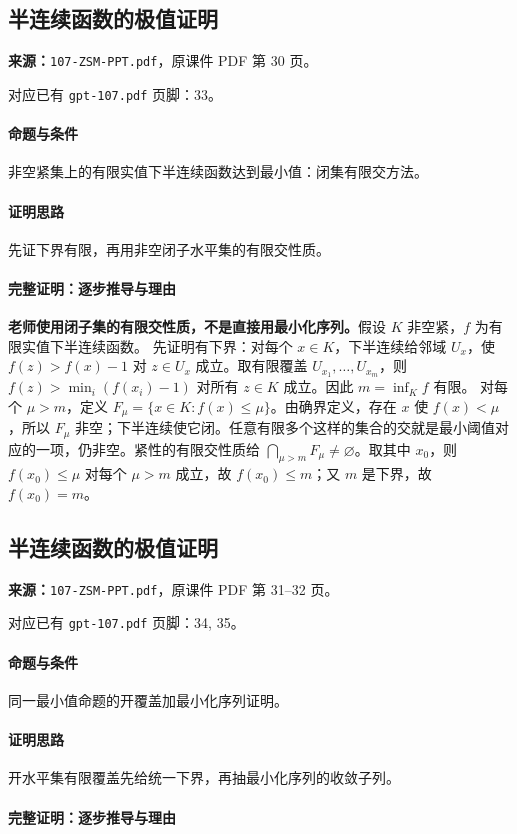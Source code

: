 \clearpage\subsection{半连续函数的极值证明}
\textbf{来源：}\texttt{107-ZSM-PPT.pdf}，原课件 PDF 第 30 页。\par
对应已有 \texttt{gpt-107.pdf} 页脚：33。\par
\paragraph{命题与条件}非空紧集上的有限实值下半连续函数达到最小值：闭集有限交方法。
\paragraph{证明思路}先证下界有限，再用非空闭子水平集的有限交性质。
\paragraph{完整证明：逐步推导与理由}
\textbf{老师使用闭子集的有限交性质，不是直接用最小化序列。}假设 $K$ 非空紧，$f$ 为有限实值下半连续函数。
先证明有下界：对每个 $x\in K$，下半连续给邻域 $U_x$，使 $f(z)>f(x)-1$ 对 $z\in U_x$ 成立。取有限覆盖 $U_{x_1},\ldots,U_{x_m}$，则 $f(z)>\min_i(f(x_i)-1)$ 对所有 $z\in K$ 成立。因此 $m=\inf_K f$ 有限。
对每个 $\mu>m$，定义 $F_\mu=\{x\in K:f(x)\le\mu\}$。由确界定义，存在 $x$ 使 $f(x)<\mu$，所以 $F_\mu$ 非空；下半连续使它闭。任意有限多个这样的集合的交就是最小阈值对应的一项，仍非空。紧性的有限交性质给 $\bigcap_{\mu>m}F_\mu\ne\varnothing$。取其中 $x_0$，则 $f(x_0)\le\mu$ 对每个 $\mu>m$ 成立，故 $f(x_0)\le m$；又 $m$ 是下界，故 $f(x_0)=m$。
\clearpage\subsection{半连续函数的极值证明}
\textbf{来源：}\texttt{107-ZSM-PPT.pdf}，原课件 PDF 第 31--32 页。\par
对应已有 \texttt{gpt-107.pdf} 页脚：34, 35。\par
\paragraph{命题与条件}同一最小值命题的开覆盖加最小化序列证明。
\paragraph{证明思路}开水平集有限覆盖先给统一下界，再抽最小化序列的收敛子列。
\paragraph{完整证明：逐步推导与理由}

